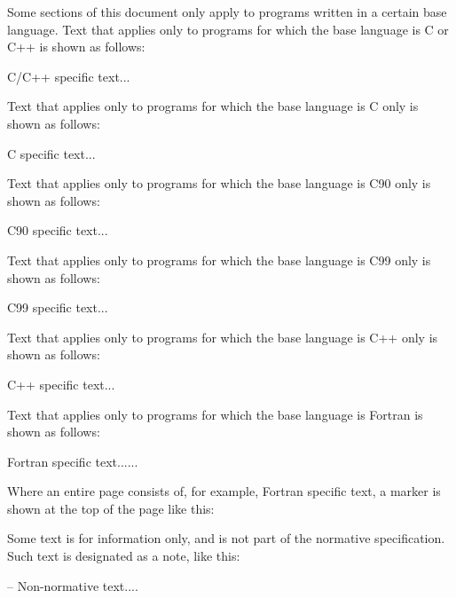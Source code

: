 Some sections of this document only apply to programs written in a certain base 
language. Text that applies only to programs for which the base language is C or C++ is shown 
as follows: 

\ccppspecificstart
C/C++ specific text...
\ccppspecificend

Text that applies only to programs for which the base language is C only is shown as follows:

\cspecificstart
C specific text...
\cspecificend

Text that applies only to programs for which the base language is C90 only is shown as 
follows:

\cNinetyspecificstart
C90 specific text...
\cNinetyspecificend

Text that applies only to programs for which the base language is C99 only is shown as 
follows:

\cNinetyNinespecificstart
C99 specific text...
\cNinetyNinespecificend

Text that applies only to programs for which the base language is C++ only is shown as 
follows:

\cppspecificstart
C++ specific text...
\cppspecificend

Text that applies only to programs for which the base language is Fortran is shown as follows: 

\fortranspecificstart
Fortran specific text......
\fortranspecificend

Where an entire page consists of, for example, Fortran specific text, a marker is shown 
at the top of the page like this:

\bigskip
{}
\bigskip

Some text is for information only, and is not part of the normative specification. Such 
text is designated as a note, like this: 

\notestart
\noteheader – Non-normative text....
\noteend



